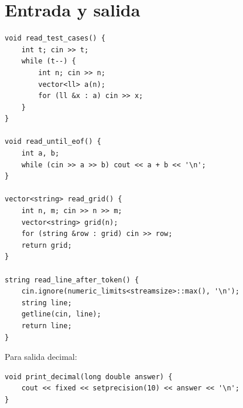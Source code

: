 \section{Entrada y salida}

\begin{lstlisting}[style=cpp]
void read_test_cases() {
    int t; cin >> t;
    while (t--) {
        int n; cin >> n;
        vector<ll> a(n);
        for (ll &x : a) cin >> x;
    }
}

void read_until_eof() {
    int a, b;
    while (cin >> a >> b) cout << a + b << '\n';
}

vector<string> read_grid() {
    int n, m; cin >> n >> m;
    vector<string> grid(n);
    for (string &row : grid) cin >> row;
    return grid;
}

string read_line_after_token() {
    cin.ignore(numeric_limits<streamsize>::max(), '\n');
    string line;
    getline(cin, line);
    return line;
}
\end{lstlisting}

Para salida decimal:
\begin{lstlisting}[style=cpp]
void print_decimal(long double answer) {
    cout << fixed << setprecision(10) << answer << '\n';
}
\end{lstlisting}
